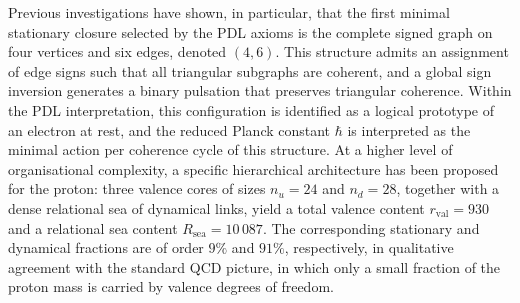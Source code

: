 \documentclass[11pt,a4paper]{article}
\begin{document}
Previous investigations have shown, in particular, that the first minimal stationary closure selected by the PDL axioms is the complete signed graph on four vertices and six edges, denoted $(4,6)$.\cite{Laubscher2026IntroPDL,Laubscher2026PDL_English} This structure admits an assignment of edge signs such that all triangular subgraphs are coherent, and a global sign inversion generates a binary pulsation that preserves triangular coherence. Within the PDL interpretation, this configuration is identified as a logical prototype of an electron at rest, and the reduced Planck constant $\hbar$ is interpreted as the minimal action per coherence cycle of this structure. At a higher level of organisational complexity, a specific hierarchical architecture has been proposed for the proton: three valence cores of sizes $n_u=24$ and $n_d=28$, together with a dense relational sea of dynamical links, yield a total valence content $r_{\mathrm{val}}=930$ and a relational sea content $R_{\mathrm{sea}}=10\,087$.\cite{Laubscher2026PDL_English,Laubscher2026LDP_French} The corresponding stationary and dynamical fractions are of order $9\%$ and $91\%$, respectively, in qualitative agreement with the standard QCD picture, in which only a small fraction of the proton mass is carried by valence degrees of freedom.\par
\end{document}
